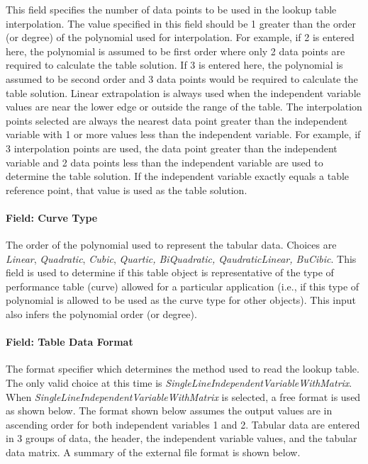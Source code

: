 This field specifies the number of data points to be used in the lookup table interpolation. The value specified in this field should be 1 greater than the order (or degree) of the polynomial used for interpolation. For example, if 2 is entered here, the polynomial is assumed to be first order where only 2 data points are required to calculate the table solution. If 3 is entered here, the polynomial is assumed to be second order and 3 data points would be required to calculate the table solution. Linear extrapolation is always used when the independent variable values are near the lower edge or outside the range of the table. The interpolation points selected are always the nearest data point greater than the independent variable with 1 or more values less than the independent variable. For example, if 3 interpolation points are used, the data point greater than the independent variable and 2 data points less than the independent variable are used to determine the table solution. If the independent variable exactly equals a table reference point, that value is used as the table solution.

\paragraph{Field: Curve Type}\label{field-curve-type-2}

The order of the polynomial used to represent the tabular data. Choices are \emph{Linear}, \emph{Quadratic}, \emph{Cubic}, \emph{Quartic, BiQuadratic, QaudraticLinear, BuCibic}. This field is used to determine if this table object is representative of the type of performance table (curve) allowed for a particular application (i.e., if this type of polynomial is allowed to be used as the curve type for other objects). This input also infers the polynomial order (or degree).


\paragraph{Field: Table Data Format}\label{field-table-data-format}

The format specifier which determines the method used to read the lookup table. The only valid choice at this time is \emph{SingleLineIndependentVariableWithMatrix}. When \emph{SingleLineIndependentVariableWithMatrix} is selected, a free format is used as shown below. The format shown below assumes the output values are in ascending order for both independent variables 1 and 2. Tabular data are entered in 3 groups of data, the header, the independent variable values, and the tabular data matrix. A summary of the external file format is shown below.


